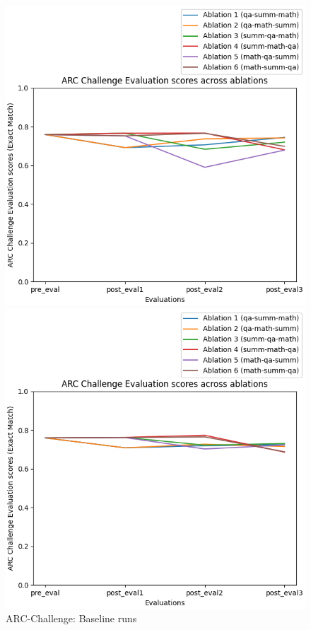 \begin{figure}[H]
    \centering
    \begin{minipage}{0.45\textwidth}
        \centering
        \includegraphics[width=1.1\textwidth]{Figures/results/trace_baseline_graphs/arc_challenge/arc_challenge_eval_baseline.png} %
        \captionsetup{width=1.1\textwidth}
        \caption{ARC-Challenge: Baseline runs}
        \label{ARCAblationBaseline}
    \end{minipage}\hfill
    \begin{minipage}{0.45\textwidth}
        \centering
        \includegraphics[width=1.1\textwidth]{Figures/results/trace_mitigation_graphs/arc_challenge/arc_challenge_eval_mitigation.png} %

\end{minipage}
\end{figure}
